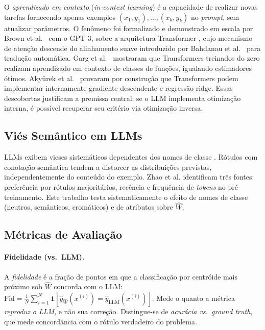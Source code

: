 \documentclass[12pt,a4paper]{article}
\newcommand{\West}{\ensuremath{\hat{W}}}   %
\begin{document}
O \emph{aprendizado em contexto} (\emph{in-context learning}) é a capacidade de realizar
novas tarefas fornecendo apenas
exemplos $(x_1,y_1),\ldots,(x_k,y_k)$ no \emph{prompt}, sem atualizar parâmetros. O
fenômeno foi formalizado e demonstrado em escala por Brown et
al.~\cite{brownLanguageModels2020} com o GPT-3, sobre a arquitetura Transformer
\cite{vaswaniAttention2017}, cujo mecanismo de atenção descende do alinhamento suave
introduzido por Bahdanau et al.~\cite{bahdanauNeuralMachine2015} para tradução
automática. Garg et
al.~\cite{gargWhatTransformers2022} mostraram que Transformers treinados do zero realizam
aprendizado em contexto de classes de funções, igualando estimadores ótimos. Akyürek et
al.~\cite{akyurekWhatLearning2023} provaram por construção que Transformers podem implementar
internamente gradiente descendente e regressão ridge. Essas descobertas justificam a premissa
central: se o LLM implementa otimização interna, é possível recuperar seu critério via
otimização inversa.

\subsection{Viés Semântico em LLMs}

LLMs exibem vieses sistemáticos dependentes dos nomes de classe
\cite{zhaoCalibrateBefore2021}. Rótulos com conotação semântica tendem a distorcer as
distribuições previstas, independentemente do conteúdo do exemplo. Zhao et al. identificam
três fontes: preferência por rótulos majoritários, recência e frequência de \emph{tokens}
no pré-treinamento. Este trabalho testa sistematicamente o efeito de nomes de classe
(neutros, semânticos, cromáticos) e de atributos sobre \West{}.

\subsection{Métricas de Avaliação}
\label{sec:metricas}

\paragraph{Fidelidade (vs.\ LLM).}
A \emph{fidelidade} é a fração de pontos em que a classificação por centróide mais próximo sob
\West{} concorda com o LLM: $\text{Fid} = \frac{1}{N}\sum_{i=1}^N
\mathbf{1}[\hat{y}_{\West}(x^{(i)}) = \hat{y}_{\text{LLM}}(x^{(i)})]$. Mede o quanto a
métrica \emph{reproduz o LLM}, e não sua correção. Distingue-se de \emph{acurácia vs.\
ground truth}, que mede concordância com o rótulo verdadeiro do problema.
\end{document}
